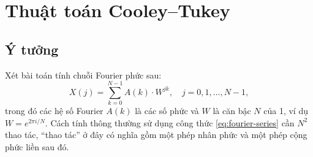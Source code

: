 \section{Thuật toán Cooley--Tukey}

\subsection{Ý tưởng}

Xét bài toán tính chuỗi Fourier phức sau: \begin{equation}
  \label{eq:fourier-series}
  X(j) = \sum_{k = 0}^{N - 1} A(k) \cdot W^{jk}, \quad j = 0, 1, \dots, N-1,
\end{equation} trong đó các hệ số Fourier $A(k)$ là các số phức và $W$ là căn
bậc $N$ của 1, ví dụ $W = e^{2 \pi i /N}$. Cách tính thông thường sử dụng công
thức \eqref{eq:fourier-series} cần $N^2$ thao tác, ``thao tác'' ở đây có nghĩa
gồm một phép nhân phức và một phép cộng phức liền sau đó.

